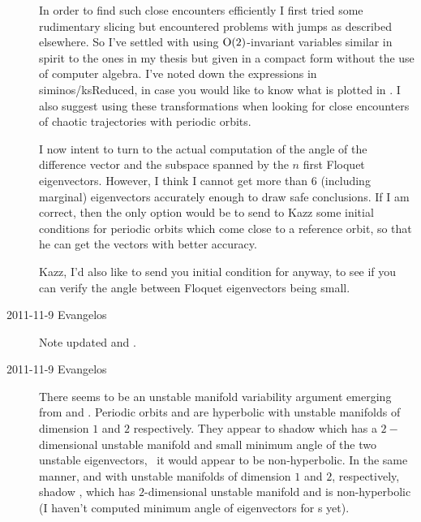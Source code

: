\begin{description}
In order to find such close encounters efficiently I first tried some
rudimentary slicing but encountered problems with jumps as described
elsewhere. So I've settled with using $\textrm{O}(2)$-invariant
variables similar in spirit to the ones in my thesis
but given in a compact form without the use of computer algebra. I've noted
down the expressions in siminos/ksReduced, in case you would like to know what
is plotted in . I also suggest using these transformations
when looking for close encounters of chaotic trajectories with periodic orbits.

I now intent to turn to the actual computation of the angle of the difference
vector and the subspace spanned by the $n$ first Floquet eigenvectors. However,
I think I cannot get more than 6 (including marginal) eigenvectors accurately
enough to draw safe conclusions. If I am correct, then the only option would be
to send to Kazz some initial conditions for periodic orbits which come close
to a reference orbit, so that he can get the vectors with better accuracy.

Kazz, I'd also like to send you initial condition for  anyway, to
see if you can verify the angle between Floquet eigenvectors being small.

%
%

\item[2011-11-9 Evangelos] Note updated  and .

\item[2011-11-9 Evangelos] There seems to be an unstable manifold variability argument
emerging from  and . Periodic orbits
 and  are hyperbolic with unstable manifolds of dimension $1$ and $2$
respectively. They appear to shadow  which has a $2-$dimensional unstable manifold
and small minimum angle of the two unstable eigenvectors, \ie\ it would appear
to be non-hyperbolic. In the same manner,  and  with unstable manifolds
of dimension $1$ and $2$, respectively, shadow , which has $2$-dimensional
unstable manifold and is non-hyperbolic (I haven't computed minimum angle of eigenvectors
for \rpo s yet).


\end{description}
